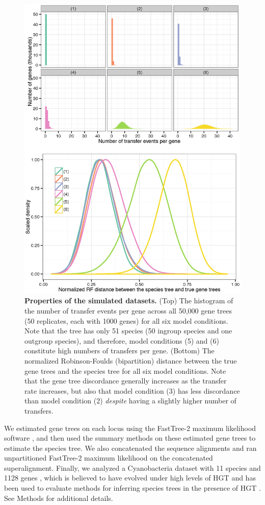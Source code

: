   \begin{figure}
\centering
\includegraphics[width=12cm]{hgt-figs/both.eps}
 \caption[Properties of simulated datasets for HGT+ILS study]{{\bf Properties of the simulated datasets.  } 
(Top) The histogram of the number of transfer events per gene across all 50,000 gene trees (50 replicates, each with 1000 genes) for all six model conditions. Note that the tree has only 51 species (50
ingroup species and one outgroup species), and therefore, model conditions (5) and (6) constitute high numbers of transfers per gene. 
(Bottom) The normalized Robinson-Foulds (bipartition)  distance 
between the true gene trees and the species tree for all six model conditions. Note that the gene tree discordance generally increases as the transfer rate increases, but also that model condition (3) has less discordance than model condition (2) {\em despite} having a slightly higher number of transfers. }
\label{hgt::sim}
      \end{figure}


We estimated gene trees on each
locus using the FastTree-2  maximum likelihood software \cite{price2010fasttree}, 
and then used the 
summary methods on these 
estimated gene trees to estimate the species tree.
We also concatenated the sequence alignments and ran unpartitioned
FastTree-2
maximum likelihood 
on the concatenated superalignment. 
Finally, 
we analyzed a
Cyanobacteria dataset with 11 species and 1128 genes \cite{Cyanobacteria}, which
is believed to have evolved under high levels of HGT and 
has been used to evaluate  methods for inferring species trees in 
the presence of HGT \cite{BansalHGTProkaryotes,wQMC}. 
See Methods for additional details.

